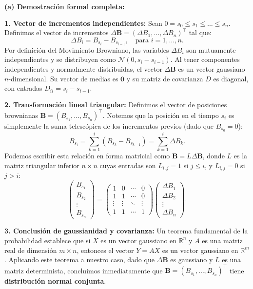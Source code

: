 \documentclass[11pt, letterpaper]{article}
\begin{document}
\begin{solucion}
    \vspace{3mm}
    \textbf{(a) Demostración formal completa:}

    \textbf{1. Vector de incrementos independientes:}
    Sean $0 = s_0 \le s_1 \le \dots \le s_n$. Definimos el vector de incrementos $\Delta \mathbf{B} = (\Delta B_1, \dots, \Delta B_n)^\top$ tal que:
    \[ \Delta B_i = B_{s_i} - B_{s_{i-1}}, \quad \text{para } i = 1, \dots, n. \]
    Por definición del Movimiento Browniano, las variables $\Delta B_i$ son mutuamente independientes y se distribuyen como $\mathcal{N}(0, s_i - s_{i-1})$. 
    Al tener componentes independientes y normalmente distribuidas, el vector $\Delta \mathbf{B}$ es un vector gaussiano $n$-dimensional. Su vector de medias es $\mathbf{0}$ y su matriz de covarianza $D$ es diagonal, con entradas $D_{ii} = s_i - s_{i-1}$.

    \textbf{2. Transformación lineal triangular:}
    Definimos el vector de posiciones brownianas $\mathbf{B} = (B_{s_1}, \dots, B_{s_n})^\top$. 
    Notemos que la posición en el tiempo $s_i$ es simplemente la suma telescópica de los incrementos previos (dado que $B_{s_0} = 0$):
    \[ B_{s_i} = \sum_{k=1}^i (B_{s_k} - B_{s_{k-1}}) = \sum_{k=1}^i \Delta B_k. \]
    Podemos escribir esta relación en forma matricial como $\mathbf{B} = L \Delta \mathbf{B}$, donde $L$ es la matriz triangular inferior $n \times n$ cuyas entradas son $L_{i,j} = 1$ si $j \le i$, y $L_{i,j} = 0$ si $j > i$:
    \[ 
    \begin{pmatrix} B_{s_1} \\ B_{s_2} \\ \vdots \\ B_{s_n} \end{pmatrix} 
    = \begin{pmatrix} 
    1 & 0 & \cdots & 0 \\
    1 & 1 & \cdots & 0 \\
    \vdots & \vdots & \ddots & \vdots \\
    1 & 1 & \cdots & 1
    \end{pmatrix}
    \begin{pmatrix} \Delta B_1 \\ \Delta B_2 \\ \vdots \\ \Delta B_n \end{pmatrix}.
    \]

    \textbf{3. Conclusión de gaussianidad y covarianza:}
    Un teorema fundamental de la probabilidad establece que si $X$ es un vector gaussiano en $\mathbb{R}^n$ y $A$ es una matriz real de dimensión $m \times n$, entonces el vector $Y = AX$ es un vector gaussiano en $\mathbb{R}^m$.
    Aplicando este teorema a nuestro caso, dado que $\Delta \mathbf{B}$ es gaussiano y $L$ es una matriz determinista, concluimos inmediatamente que $\mathbf{B} = (B_{s_1}, \dots, B_{s_n})^\top$ tiene \textbf{distribución normal conjunta}.


\end{solucion}
\end{document}

